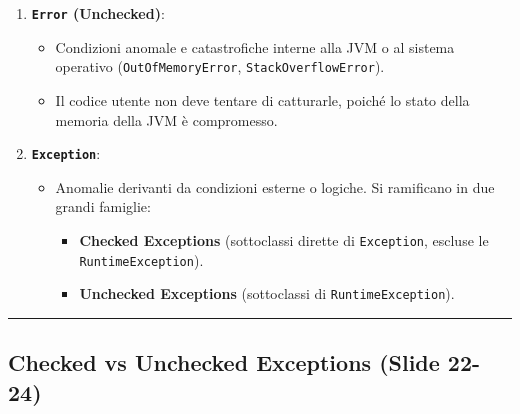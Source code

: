 \documentclass[11pt,a4paper,oneside]{report}
\newcommand{\passthrough}[1]{#1}
\providecommand{\tightlist}{\setlength{\itemsep}{0pt}\setlength{\parskip}{0pt}}
\begin{document}
\begin{enumerate}
\def\labelenumi{\arabic{enumi}.}
\tightlist
\item
  \textbf{\passthrough{\lstinline!Error!} (Unchecked)}:

  \begin{itemize}
  \tightlist
  \item
    Condizioni anomale e catastrofiche interne alla JVM o al sistema
    operativo (\passthrough{\lstinline!OutOfMemoryError!},
    \passthrough{\lstinline!StackOverflowError!}).
  \item
    Il codice utente non deve tentare di catturarle, poiché lo stato
    della memoria della JVM è compromesso.
  \end{itemize}
\item
  \textbf{\passthrough{\lstinline!Exception!}}:

  \begin{itemize}
  \tightlist
  \item
    Anomalie derivanti da condizioni esterne o logiche. Si ramificano in
    due grandi famiglie:

    \begin{itemize}
    \tightlist
    \item
      \textbf{Checked Exceptions} (sottoclassi dirette di
      \passthrough{\lstinline!Exception!}, escluse le
      \passthrough{\lstinline!RuntimeException!}).
    \item
      \textbf{Unchecked Exceptions} (sottoclassi di
      \passthrough{\lstinline!RuntimeException!}).
    \end{itemize}
  \end{itemize}
\end{enumerate}

\begin{center}\rule{0.5\linewidth}{0.5pt}\end{center}

\subsection{Checked vs Unchecked Exceptions (Slide
22-24)}\label{chap16_checked-vs-unchecked-exceptions-slide-22-24}
\end{document}
